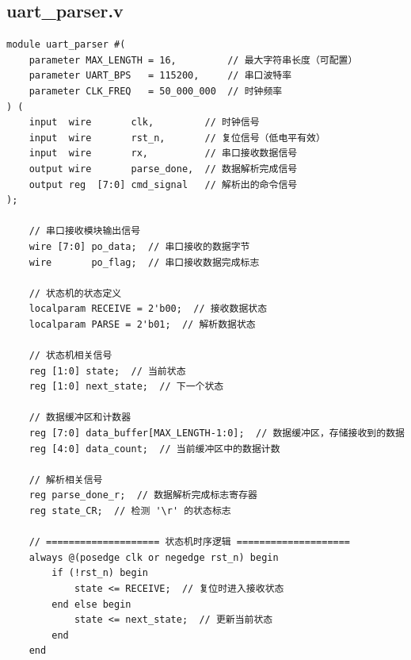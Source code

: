 \documentclass[a4paper,10pt]{article}
\begin{document}
\subsection{uart_parser.v}
\begin{lstlisting}[caption=uart_parser.v]
module uart_parser #(
    parameter MAX_LENGTH = 16,         // 最大字符串长度（可配置）
    parameter UART_BPS   = 115200,     // 串口波特率
    parameter CLK_FREQ   = 50_000_000  // 时钟频率
) (
    input  wire       clk,         // 时钟信号
    input  wire       rst_n,       // 复位信号（低电平有效）
    input  wire       rx,          // 串口接收数据信号
    output wire       parse_done,  // 数据解析完成信号
    output reg  [7:0] cmd_signal   // 解析出的命令信号
);

    // 串口接收模块输出信号
    wire [7:0] po_data;  // 串口接收的数据字节
    wire       po_flag;  // 串口接收数据完成标志

    // 状态机的状态定义
    localparam RECEIVE = 2'b00;  // 接收数据状态
    localparam PARSE = 2'b01;  // 解析数据状态

    // 状态机相关信号
    reg [1:0] state;  // 当前状态
    reg [1:0] next_state;  // 下一个状态

    // 数据缓冲区和计数器
    reg [7:0] data_buffer[MAX_LENGTH-1:0];  // 数据缓冲区，存储接收到的数据
    reg [4:0] data_count;  // 当前缓冲区中的数据计数

    // 解析相关信号
    reg parse_done_r;  // 数据解析完成标志寄存器
    reg state_CR;  // 检测 '\r' 的状态标志

    // ==================== 状态机时序逻辑 ====================
    always @(posedge clk or negedge rst_n) begin
        if (!rst_n) begin
            state <= RECEIVE;  // 复位时进入接收状态
        end else begin
            state <= next_state;  // 更新当前状态
        end
    end


\end{lstlisting}
\end{document}
